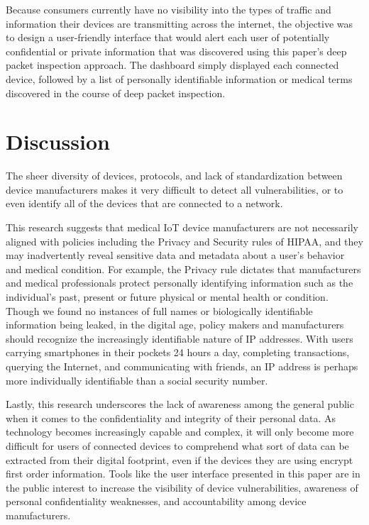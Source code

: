Because consumers currently have no visibility into the types of traffic and information their devices are transmitting across the internet, the objective was to design a user-friendly interface that would alert each user of potentially confidential or private information that was discovered using this paper's deep packet inspection approach. The dashboard simply displayed each connected device, followed by a list of personally identifiable information or medical terms discovered in the course of deep packet inspection. 

\section{Discussion}

The sheer diversity of devices, protocols, and lack of standardization between device manufacturers makes it very difficult to detect all vulnerabilities, or to even identify all of the devices that are connected to a network.

This research suggests that medical IoT device manufacturers are not necessarily aligned with policies including the Privacy and Security rules of HIPAA, and they may inadvertently reveal sensitive data and metadata about a user's behavior and medical condition. For example, the Privacy rule dictates that manufacturers and medical professionals protect personally identifying information such as the individual's past, present or future physical or mental health or condition. Though we found no instances of full names or biologically identifiable information being leaked, in the digital age, policy makers and manufacturers should recognize the increasingly identifiable nature of IP addresses. With users carrying smartphones in their pockets 24 hours a day, completing transactions, querying the Internet, and communicating with friends, an IP address is perhaps more individually identifiable than a social security number.

Lastly, this research underscores the lack of awareness among the general public when it comes to the confidentiality and integrity of their personal data. As technology becomes increasingly capable and complex, it will only become more difficult for users of connected devices to comprehend what sort of data can be extracted from their digital footprint, even if the devices they are using encrypt first order information. Tools like the user interface presented in this paper are in the public interest to increase the visibility of device vulnerabilities, awareness of personal confidentiality weaknesses, and accountability among device manufacturers.


